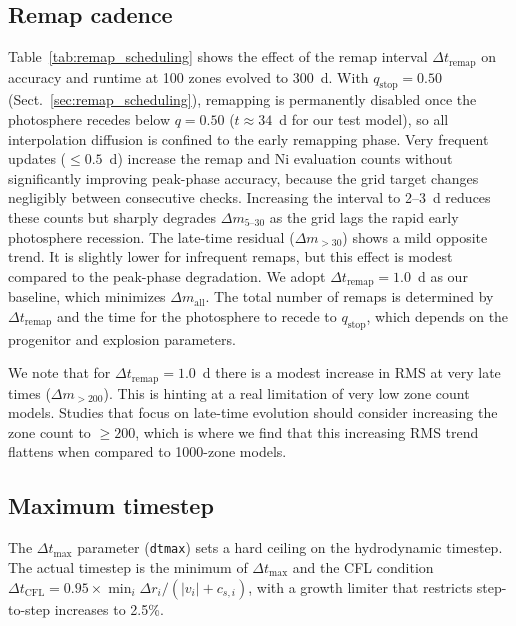 \documentclass[twocolumn,linenumbers]{aastex701}
\begin{document}
\subsection{Remap cadence}
\label{sec:grid_cadence_sweep}
Table~\ref{tab:remap_scheduling} shows the effect of the remap interval $\Delta t_{\mathrm{remap}}$ on accuracy and runtime at 100 zones evolved to 300~d. With $q_\mathrm{stop} = 0.50$ (Sect.~\ref{sec:remap_scheduling}), remapping is permanently disabled once the photosphere recedes below $q = 0.50$ ($t \approx 34$~d for our test model), so all interpolation diffusion is confined to the early remapping phase. Very frequent updates ($\leq0.5$~d) increase the remap and Ni evaluation counts without significantly improving peak-phase accuracy, because the grid target changes negligibly between consecutive checks. Increasing the interval to 2--3~d reduces these counts but sharply degrades $\Delta m_{5\text{--}30}$ as the grid lags the rapid early photosphere recession. The late-time residual ($\Delta m_{>30}$) shows a mild opposite trend. It is slightly lower for infrequent remaps, but this effect is modest compared to the peak-phase degradation. We adopt $\Delta t_{\mathrm{remap}} = 1.0$~d as our baseline, which minimizes $\Delta m_\mathrm{all}$. The total number of remaps is determined by $\Delta t_{\mathrm{remap}}$ and the time for the photosphere to recede to $q_\mathrm{stop}$, which depends on the progenitor and explosion parameters.

We note that for $\Delta t_{\mathrm{remap}} = 1.0$~d there is a modest increase in RMS at very late times ($\Delta m_{>200}$). This is hinting at a real limitation of very low zone count models. Studies that focus on late-time evolution should consider increasing the zone count to $\geq200$, which is where we find that this increasing RMS trend flattens when compared to 1000-zone models. 

\subsection{Maximum timestep}
\label{sec:dtmax_sweep}

The $\Delta t_{\mathrm{max}}$ parameter (\texttt{dtmax}) sets a hard ceiling on the hydrodynamic timestep. The actual timestep is the minimum of $\Delta t_{\mathrm{max}}$ and the CFL condition $\Delta t_\mathrm{CFL} = 0.95 \times \min_i \Delta r_i / (|v_i| + c_{s,i})$, with a growth limiter that restricts step-to-step increases to 2.5\%.
\end{document}

